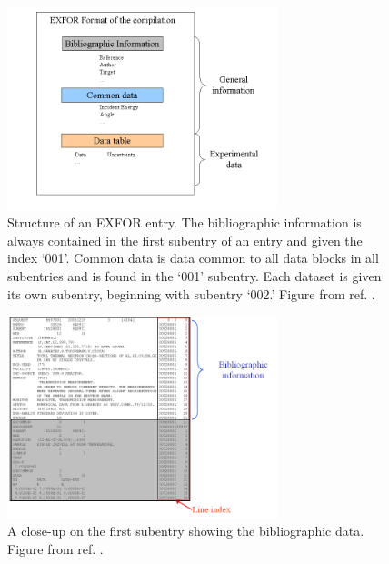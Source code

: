 \documentclass[11pt]{article}
\begin{document}
\begin{figure}[htbp]
\begin{center}
\includegraphics[width=0.7\textwidth]{figs/exfor02.png}
\caption{\label{fig:1}Structure of an EXFOR entry.  The bibliographic information is always contained in the first subentry of an entry and given the index `001'.  Common data is data common to all data blocks in all subentries and is found in the `001' subentry.  Each dataset is given its own subentry, beginning with subentry `002.'  Figure from ref. \cite{web}.}
\end{center}
\end{figure}

\begin{figure}[htbp]
\begin{center}
\includegraphics[width=0.7\textwidth]{figs/bib01.png}
\caption{\label{fig:2}A close-up on the first subentry showing the bibliographic data.  Figure from ref. \cite{web}.}
\end{center}
\end{figure}
\end{document}
